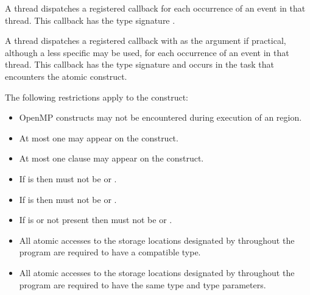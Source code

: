 A thread dispatches a registered 
callback for each occurrence of an  event
in that thread.  This callback has the type signature .

A thread dispatches a registered 
callback with   as the  argument if 
practical, although a less specific  may be used, for each 
occurrence of an  event in that thread.  This 
callback has the type signature  and 
occurs in the task that encounters the atomic construct.

\restrictions
The following restrictions apply to the  construct:

\begin{itemize}
\item OpenMP constructs may not be encountered during execution of an
       region.
\item At most one  may appear on the construct.
\item At most one  clause may appear on the construct.
\item If  is  then 
      must not be  or .
\item If  is  then 
      must not be  or .
\item If  is  or not present then 
       must not be  or .
\end{itemize}

\begin{ccppspecific}
\begin{itemize}
\item All atomic accesses to the storage locations designated by  
      throughout the program are required to have a compatible type.
\end{itemize}
\end{ccppspecific}

\begin{fortranspecific}
\begin{itemize}
\item All atomic accesses to the storage locations designated by  
      throughout the program are required to have the same type and type parameters.
\end{itemize}
\end{fortranspecific}

